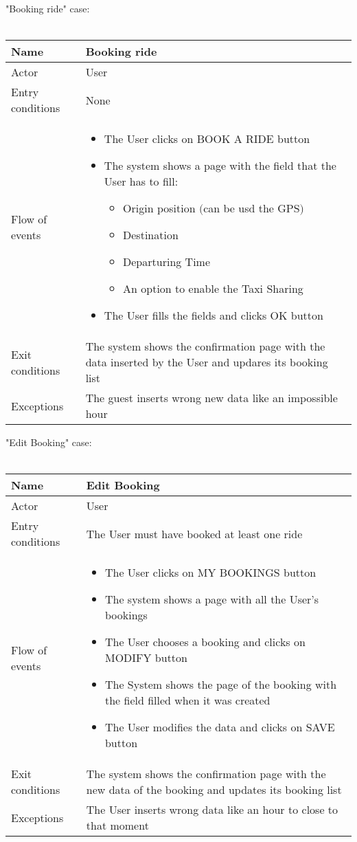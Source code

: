 \newpage
"Booking ride" case:
\\
\\
\begin{tabular}{|l|p{10cm}|} 
\hline
Name & Booking ride\\
\hline
Actor & User\\
\hline
Entry conditions & None\\
\hline
Flow of events &
	\begin{itemize}
		\item The User clicks on BOOK A RIDE button
		\item The system shows a page with the field that the User has to fill:
		\begin{itemize}
			\item Origin position $($can be usd the GPS$)$
			\item Destination
			\item Departuring Time
			\item An option to enable the Taxi Sharing
		\end{itemize}
		\item The User fills the fields and clicks OK button
	\end{itemize}\\
\hline
Exit conditions & The system shows the confirmation page with the data inserted by the User and updares its booking list\\
\hline
Exceptions & The guest inserts wrong new data like an impossible hour\\
\hline
\end {tabular}


\newpage
"Edit Booking" case:
\\
\\
\begin{tabular}{|l|p{10cm}|} 
\hline
Name & Edit Booking\\
\hline
Actor & User\\
\hline
Entry conditions & The User must have booked at least one ride\\
\hline
Flow of events &
	\begin{itemize}
			\item The User clicks on MY BOOKINGS button
			\item The system shows a page with all the User's bookings
			\item The User chooses a booking and clicks on MODIFY button
			\item The System shows the page of the booking with the field filled when it was created
			\item The User modifies the data and clicks on SAVE button
	\end{itemize}\\			
\hline
Exit conditions & The system shows the confirmation page with the new data of the booking and updates its booking list\\
\hline
Exceptions & The User inserts wrong data like an hour to close to that moment\\
\hline
\end {tabular}

